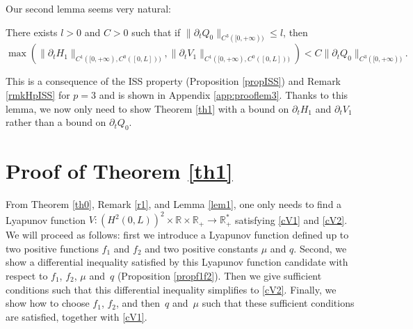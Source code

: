 Our second lemma seems very natural:
\begin{lem}\label{lem3}
There exists $l>0$ and $C>0$
such that if $\lVert\partial_{t}Q_{0}\rVert_{C^{3}([0,+\infty))}\leq l$, then
\begin{equation*}
\max\left(\lVert\partial_{t}H_{1}\rVert_{C^{1}([0,+\infty), {C^{0}([0,L])})},\lVert\partial_{t}V_{1}\rVert_{C^{1}([0,+\infty), {C^{0}([0,L])})}\right)< C \lVert\partial_{t}Q_{0}\rVert_{C^{3}([0,+\infty))}.
\end{equation*}
\end{lem}
This is a consequence of the ISS property (Proposition \ref{propISS}) and Remark \ref{rmkHpISS} for $p=3$ and is shown in Appendix \ref{app:prooflem3}.
Thanks to this lemma, we now only need to show Theorem \ref{th1} with a bound on $\partial_{t}H_{1}$ and $\partial_{t}V_{1}$ rather than a bound on $\partial_{t}Q_{0}$.

\section{{Proof of Theorem \ref{th1}}}
\label{sec:proofth1}
From Theorem {\ref{th0}}, Remark \ref{r1}, and Lemma \ref{lem1}, one only needs to find a Lyapunov function $V: (H^{2}(0,L))^{2}\times\mathbb{R}\times\mathbb{R}_{+}\to \mathbb{R}_{+}^{*}$ satisfying \eqref{cV1} and \eqref{cV2}.
{We will proceed as follows: first we introduce a Lyapunov function defined up to two positive functions $f_{1}$ and $f_{2}$ and two positive constants $\mu$ and $q$. Second, we show a differential inequality satisfied by this Lyapunov function candidate with respect to $f_{1}$, $f_{2}$, $\mu$ and~$q$ (Proposition \ref{propf1f2}). Then we give sufficient conditions such that this differential inequality simplifies to \eqref{cV2}. Finally, we show how to choose $f_{1}$, $f_{2}$, and then~$q$ and~$\mu$ such that these sufficient conditions are satisfied, together with \eqref{cV1}.}

